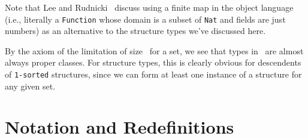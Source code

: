 \begin{node}[Structures]
\begin{node}[Remarks]
\begin{node}\label{mizar-001A}%
Note that Lee and Rudnicki~\cite{Lee2007alternative} discuss using a
finite map in the object language (i.e., literally a \texttt{Function}
whose domain is a subset of \texttt{Nat} and fields are just numbers) as
an alternative to the structure types we've discussed here.
\end{node}

\begin{node}\label{mizar-001B}%
By the axiom of the limitation of size~ for a set, we see
that types in \Mizar\ are almost always proper classes. For structure
types, this is clearly obvious for descendents of \texttt{1-sorted}
structures, since we can form at least one instance of a structure for
any given set.
\end{node}
\end{node} %

\end{node}

\section{Notation and Redefinitions}

